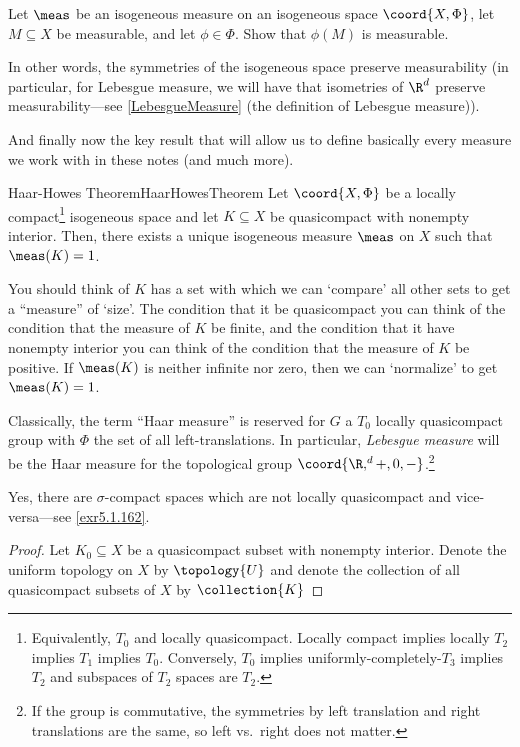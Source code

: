 \begin{exr}{}{}
Let $\meas$ be an isogeneous measure on an isogeneous space $\coord{X,\Phi}$, let $M\subseteq X$ be measurable, and let $\phi \in \Phi$.  Show that $\phi (M)$ is measurable.
\begin{rmk}
In other words, the symmetries of the isogeneous space preserve measurability (in particular, for Lebesgue measure, we will have that isometries of $\R ^d$ preserve measurability---see \cref{LebesgueMeasure} (the definition of Lebesgue measure)).
\end{rmk}
\end{exr}

And finally now the key result that will allow us to define basically every measure we work with in these notes (and much more).
\begin{thm}{Haar-Howes Theorem}{HaarHowesTheorem}
Let $\coord{X,\Phi}$ be a locally compact\footnote{Equivalently, $T_0$ and locally quasicompact.  Locally compact implies locally $T_2$ implies $T_1$ implies $T_0$.  Conversely, $T_0$ implies uniformly-completely-$T_3$ implies $T_2$ and subspaces of $T_2$ spaces are $T_2$.} isogeneous space and let $K\subseteq X$ be quasicompact with nonempty interior.  Then, there exists a unique isogeneous measure $\meas$ on $X$ such that $\meas (K)=1$.
\begin{rmk}
You should think of $K$ has a set with which we can `compare' all other sets to get a ``measure'' of `size'.  The condition that it be quasicompact you can think of the condition that the measure of $K$ be finite, and the condition that it have nonempty interior you can think of the condition that the measure of $K$ be positive.  If $\meas (K)$ is neither infinite nor zero, then we can `normalize' to get $\meas (K)=1$.
\end{rmk}
\begin{rmk}
Classically, the term ``Haar measure'' is reserved for $G$ a $T_0$ locally quasicompact group with $\Phi$ the set of all left-translations.  In particular, \emph{Lebesgue measure} will be the Haar measure for the topological group $\coord{\R ,^d+,0,-}$.\footnote{If the group is commutative, the symmetries by left translation and right translations are the same, so left vs.~right does not matter.}
\end{rmk}
\begin{rmk}
Yes, there are $\sigma$-compact spaces which are not locally quasicompact and vice-versa---see \cref{exr5.1.162}.
\end{rmk}
\begin{proof}
Let $K_0\subseteq X$ be a quasicompact subset with nonempty interior.  Denote the uniform topology on $X$ by $\topology{U}$ and denote the collection of all quasicompact subsets of $X$ by $\collection{K}$


\end{proof}
\end{thm}

